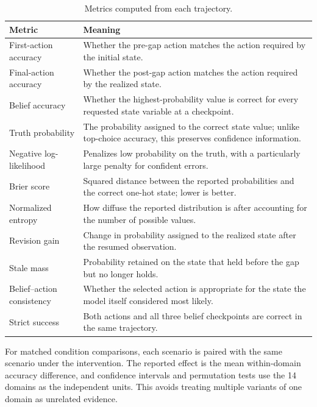 \documentclass{article}
\newcommand{\dualcolhead}[1]{\textbf{#1}}
\begin{document}
\begin{table}[htbp]
  \centering
  \footnotesize
  \setlength{\tabcolsep}{5pt}
  \renewcommand{\arraystretch}{1.12}
  \caption{Metrics computed from each trajectory.}
  \label{tab:metric-definitions}
  \begin{tabularx}{\textwidth}{@{}Q{0.25\textwidth}Z@{}}
    \toprule
    \dualcolhead{Metric} & \dualcolhead{Meaning} \\
    \midrule
    First-action accuracy & Whether the pre-gap action matches the action required by the initial state. \\
    Final-action accuracy & Whether the post-gap action matches the action required by the realized state. \\
    Belief accuracy & Whether the highest-probability value is correct for every requested state variable at a checkpoint. \\
    Truth probability & The probability assigned to the correct state value; unlike top-choice accuracy, this preserves confidence information. \\
    Negative log-likelihood & Penalizes low probability on the truth, with a particularly large penalty for confident errors. \\
    Brier score & Squared distance between the reported probabilities and the correct one-hot state; lower is better. \\
    Normalized entropy & How diffuse the reported distribution is after accounting for the number of possible values. \\
    Revision gain & Change in probability assigned to the realized state after the resumed observation. \\
    Stale mass & Probability retained on the state that held before the gap but no longer holds. \\
    Belief--action consistency & Whether the selected action is appropriate for the state the model itself considered most likely. \\
    Strict success & Both actions and all three belief checkpoints are correct in the same trajectory. \\
    \bottomrule
  \end{tabularx}
\end{table}

For matched condition comparisons, each scenario is paired with the same scenario under the intervention. The reported effect is the mean within-domain accuracy difference, and confidence intervals and permutation tests use the 14 domains as the independent units. This avoids treating multiple variants of one domain as unrelated evidence.
\end{document}
